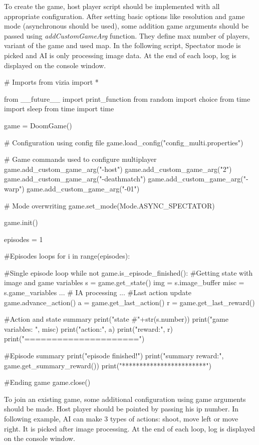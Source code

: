 	To create the game, host player script should be implemented with all appropriate configuration. After setting basic options like resolution and game mode (asynchronous should be used), some addition game arguments should be passed using \emph{addCustomGameArg} function. They define max number of players, variant of the game and used map. In the following script, Spectator mode is picked and AI is only processing image data. At the end of each loop, log is displayed on the console window.

\begin{pblock}
# Imports
from vizia import *

from __future__ import print_function
from random import choice
from time import sleep
from time import time

game = DoomGame()

# Configuration using config file
game.load_config("config_multi.properties")

# Game commands used to configure multiplayer
game.add_custom_game_arg("-host")
game.add_custom_game_arg("2")
game.add_custom_game_arg("-deathmatch")
game.add_custom_game_arg("-warp")
game.add_custom_game_arg("-01")

# Mode overwriting 
game.set_mode(Mode.ASYNC_SPECTATOR)

game.init()
	
episodes = 1

#Episodes loops
for i in range(episodes):

	#Single episode loop
	while not game.is_episode_finished():
		#Getting state with image and game variables	
		s = game.get_state()
		img = s.image_buffer
		misc = s.game_variables
		...
		# IA processing
		...	
		#Last action update
		game.advance_action()
		a = game.get_last_action()
		r = game.get_last_reward()
			
		#Action and state summary
		print("state #"+str(s.number))
		print("game variables: ", misc)
		print("action:", a)
		print("reward:", r)
		print("=====================")

	#Episode summary	
	print("episode finished!")
	print("summary reward:", game.get_summary_reward())
	print("************************")

#Ending game
game.close()
\end{pblock}


	To join an existing game, some additional configuration using game arguments should be made. Host player should be pointed by passing his ip number. In following example, AI can make 3 types of actions: shoot, move left or move right. It is picked after image processing. At the end of each loop, log is displayed on the console window.

